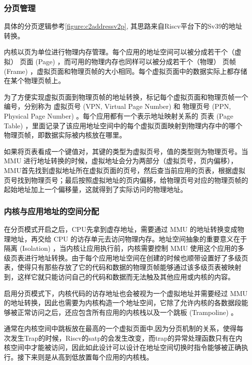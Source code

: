 \subsubsection{分页管理}

具体的分页逻辑参考\autoref{figure:c2addressv2p}, 其思路来自Riscv平台下的Sv39的地址转换。

内核以页为单位进行物理内存管理。每个应用的地址空间可以被分成若干个（虚拟） 页面 (Page) ，而可用的物理内存也同样可以被分成若干个（物理） 页帧 (Frame) ，虚拟页面和物理页帧的大小相同。每个虚拟页面中的数据实际上都存储在某个物理页帧上。

为了方便实现虚拟页面到物理页帧的地址转换，标记每个虚拟页面和物理页帧一个编号，分别称为 虚拟页号 (VPN, Virtual Page Number) 和 物理页号 (PPN, Physical Page Number) 。每个应用都有一个表示地址映射关系的 页表 (Page Table) ，里面记录了该应用地址空间中的每个虚拟页面映射到物理内存中的哪个物理页帧，即数据实际被内核放在哪里。

如果将页表看成一个键值对，其键的类型为虚拟页号，值的类型则为物理页号。当 MMU 进行地址转换的时候，虚拟地址会分为两部分（虚拟页号，页内偏移），MMU首先找到虚拟地址所在虚拟页面的页号，然后查当前应用的页表，根据虚拟页号找到物理页号；最后按照虚拟地址的页内偏移，给物理页号对应的物理页帧的起始地址加上一个偏移量，这就得到了实际访问的物理地址。

\subsubsection{内核与应用地址的空间分配}

在分页模式开启之后，CPU先拿到虚存地址，需要通过 MMU 的地址转换变成物理地址，再交给 CPU 的访存单元去访问物理内存。地址空间抽象的重要意义在于 隔离 (Isolation) ，当内核让应用执行前，内核需要控制 MMU 使用这个应用的多级页表进行地址转换。由于每个应用地址空间在创建的时候也顺带设置好了多级页表，使得只有那些存放了它的代码和数据的物理页帧能够通过该多级页表被映射到，这样它就只能访问自己的代码和数据而无法触及其他应用或内核的内容。

启用分页模式下，内核代码的访存地址也会被视为一个虚拟地址并需要经过 MMU 的地址转换，因此也需要为内核构造一个地址空间，它除了允许内核的各数据段能够被正常访问之后，还应包含所有应用的内核栈以及一个跳板 (Trampoline) 。

通常在内核空间中跳板放在最高的一个虚拟页面中,因为分页机制的关系，使得每次发生Trap的时候，Riscv的satp的会发生改变，而trap的异常处理函数只有在内核空间中才能被访问，因此如此设计可以设计在地址空间切换时指令能够被正确执行。接下来则是从高到低放置每个应用的内核栈。

